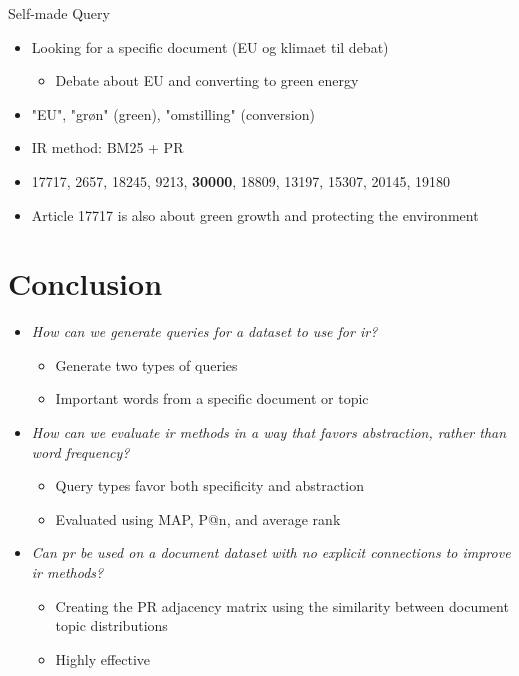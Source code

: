 \begin{frame}{\insertsection}{\insertsubsection}
	\begin{block}{Self-made Query}
		\begin{itemize}
			\item<1-> Looking for a specific document (EU og klimaet til debat)
			\begin{itemize}
				\item<1-> Debate about EU and converting to green energy
			\end{itemize}
			\item<2-> "EU", "grøn" (green), "omstilling" (conversion)
			\item<3-> IR method: BM25 + PR
			\item<4-> 17717, 2657, 18245, 9213, \textbf{30000}, 18809, 13197, 15307, 20145, 19180
			\item<5-> Article 17717 is also about green growth and protecting the environment
		\end{itemize}
	\end{block}
\end{frame}


\section{Conclusion}
\begin{frame}{\insertsection}{}
	\begin{itemize}
		\item \emph{How can we generate queries for a dataset to use for \acrshort{ir}?}
		\begin{itemize}
			\item<2-> Generate two types of queries
			\item<2-> Important words from a specific document or topic
		\end{itemize}
		\vspace{.2cm}
		\item \emph{How can we evaluate \acrshort{ir} methods in a way that favors abstraction, rather than word frequency?}
		\begin{itemize}
			\item<3-> Query types favor both specificity and abstraction
			\item<3-> Evaluated using MAP, P@n, and average rank
		\end{itemize}
		\vspace{.2cm}
		\item \emph{Can \acrshort{pr} be used on a document dataset with no explicit connections to improve \acrshort{ir} methods?}
		\begin{itemize}
			\item<4-> Creating the PR adjacency matrix using the similarity between document topic distributions
			\item<4-> Highly effective
		\end{itemize}
	\end{itemize}
\end{frame}